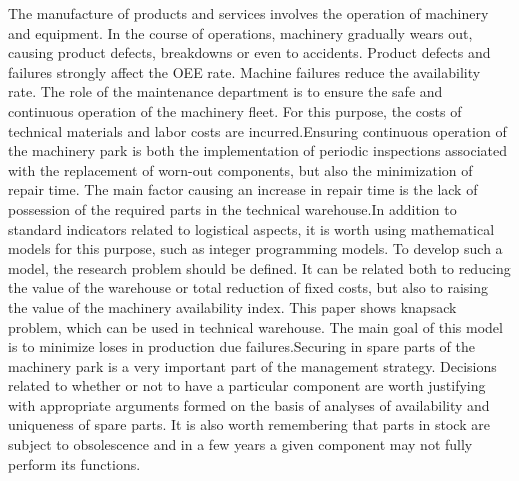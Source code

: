 
\begin{Abstrakt}
    The manufacture of products and services involves the operation of machinery and equipment. In the course of operations, machinery gradually wears out, causing product defects, breakdowns or even to accidents. Product defects and failures strongly affect the OEE rate. Machine failures reduce the availability rate. The role of the maintenance department is to ensure the safe and continuous operation of the machinery fleet. For this purpose, the costs of technical materials and labor costs are incurred.\newline Ensuring continuous operation of the machinery park is both the implementation of periodic inspections associated with the replacement of worn-out components, but also the minimization of repair time. The main factor causing an increase in repair time is the lack of possession of the required parts in the technical warehouse.\newline In addition to standard indicators related to logistical aspects, it is worth using mathematical models for this purpose, such as integer programming models. To develop such a model, the research problem should be defined. It can be related both to reducing the value of the warehouse or total reduction of fixed costs, but also to raising the value of the machinery availability index. This paper shows knapsack problem, which can be used in technical warehouse. The main goal of this model is to minimize loses in production due failures.\newline Securing in spare parts of the machinery park is a very important part of the management strategy. Decisions related to whether or not to have a particular component are worth justifying with appropriate arguments formed on the basis of analyses of availability and uniqueness of spare parts. It is also worth remembering that parts in stock are subject to obsolescence and in a few years a given component may not fully perform its functions.
\end{Abstrakt}



\clearpage